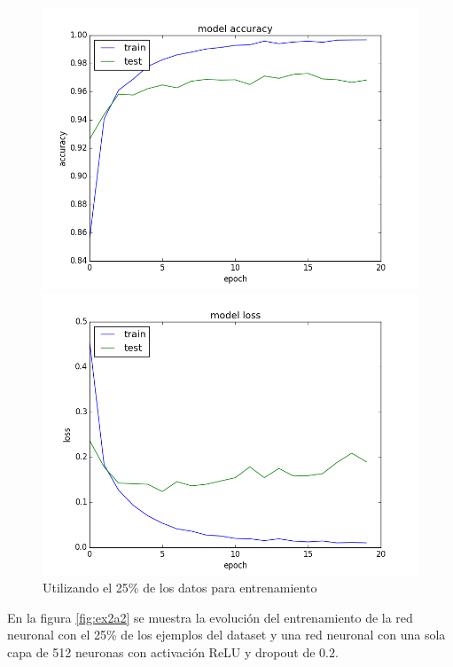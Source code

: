 \documentclass[11pt,spanish]{article}
\begin{document}
\begin{figure}[tpb]
\centering
\begin{minipage}{.5\textwidth}
  \centering
  \includegraphics[width=1\linewidth]{../ex2a1_acc.png}
\end{minipage}%
\begin{minipage}{.5\textwidth}
  \centering
  \includegraphics[width=1\linewidth]{../ex2a1_loss.png}
\end{minipage}
\caption{Utilizando el 25\% de los datos para entrenamiento}
\label{fig:ex2a1}
\end{figure}

En la figura \ref{fig:ex2a2} se muestra la evolución del entrenamiento de la red neuronal con el 25\% de los ejemplos del dataset y una red neuronal con una sola capa de 512 neuronas con activación ReLU y dropout de $0.2$. 
\end{document}
